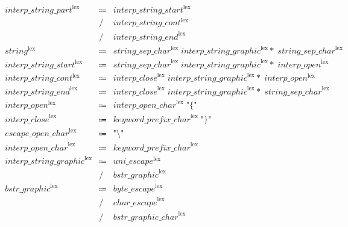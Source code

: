\begin{align*}
    \begin{array}{rcll}
        \mathit{interp\_string\_part}^\mathrm{lex}
        &\Coloneq &\mathit{interp\_string\_start}^\mathrm{lex} \\
        &\mathrel{/} &\mathit{interp\_string\_cont}^\mathrm{lex} \\
        &\mathrel{/} &\mathit{interp\_string\_end}^\mathrm{lex} \\
        \mathit{string}^\mathrm{lex}
        &\Coloneq &\mathit{string\_sep\_char}^\mathrm{lex}\; \mathit{interp\_string\_graphic}^\mathrm{lex}{*}\; \mathit{string\_sep\_char}^\mathrm{lex} \\
        \mathit{interp\_string\_start}^\mathrm{lex}
        &\Coloneq &\mathit{string\_sep\_char}^\mathrm{lex}\; \mathit{interp\_string\_graphic}^\mathrm{lex}{*}\; \mathit{interp\_open}^\mathrm{lex} \\
        \mathit{interp\_string\_cont}^\mathrm{lex}
        &\Coloneq &\mathit{interp\_close}^\mathrm{lex}\; \mathit{interp\_string\_graphic}^\mathrm{lex}{*}\; \mathit{interp\_open}^\mathrm{lex} \\
        \mathit{interp\_string\_end}^\mathrm{lex}
        &\Coloneq &\mathit{interp\_close}^\mathrm{lex}\; \mathit{interp\_string\_graphic}^\mathrm{lex}{*}\; \mathit{string\_sep\_char}^\mathrm{lex} \\
        \mathit{interp\_open}^\mathrm{lex}
        &\Coloneq &\mathit{interp\_open\_char}^\mathrm{lex}\; \texttt{"\{"} \\
        \mathit{interp\_close}^\mathrm{lex}
        &\Coloneq &\mathit{keyword\_prefix\_char}^\mathrm{lex}\; \texttt{"\}"} \\
        \mathit{escape\_open\_char}^\mathrm{lex}
        &\Coloneq &\texttt{"\textbackslash"} \\
        \mathit{interp\_open\_char}^\mathrm{lex}
        &\Coloneq &\mathit{keyword\_prefix\_char}^\mathrm{lex} \\
        \mathit{interp\_string\_graphic}^\mathrm{lex}
        &\Coloneq &\mathit{uni\_escape}^\mathrm{lex} \\
        &\mathrel{/} &\mathit{bstr\_graphic}^\mathrm{lex} \\
        \mathit{bstr\_graphic}^\mathrm{lex}
        &\Coloneq &\mathit{byte\_escape}^\mathrm{lex} \\
        &\mathrel{/} &\mathit{char\_escape}^\mathrm{lex} \\
        &\mathrel{/} &\mathit{bstr\_graphic\_char}^\mathrm{lex} \\

\end{array}
\end{align*}

